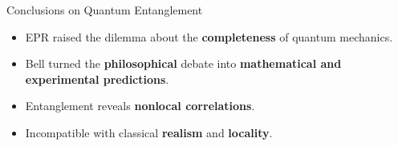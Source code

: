 \begin{frame}{Conclusions on Quantum Entanglement}

\begin{itemize}
  \item EPR raised the dilemma about the \textbf{completeness} of quantum mechanics.  
  \pause
  \item Bell turned the \textbf{philosophical} debate into \textbf{mathematical and experimental predictions}.  
  \pause

  \item Entanglement reveals \textbf{nonlocal correlations}.  
  \pause
  \item Incompatible with classical \textbf{realism} and \textbf{locality}.  
\end{itemize}

\end{frame}



